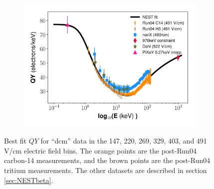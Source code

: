 \begin{figure}[h!]
\begin{subfigure}{0.5\textwidth}
  \caption{}
\end{subfigure}%
\begin{subfigure}{0.5\textwidth}
  \centering
  \includegraphics[width=\textwidth]{Figures/Yields_fit_old/NEST_fit_491Vcm_old_dcm.pdf}
  \caption{}
\end{subfigure}
\caption{Best fit $QY$ for ``dcm'' data in the 147, 220, 269, 329, 403, and 491 V/cm electric field bins. The orange points are the post-Run04 carbon-14 measurements, and the brown points are the post-Run04 tritium measurements. The other datasets are described in section \ref{sec:NESTbeta}.}
\label{fig:dcm_prelim_QY2}
\end{figure}

\clearpage
